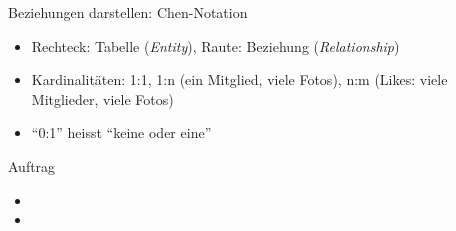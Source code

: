 \begin{frame}{Beziehungen darstellen: }{Chen-Notation}
  \begin{center}
  \end{center}
  \begin{itemize}
    \item Rechteck: Tabelle (\textit{Entity}), Raute: Beziehung (\textit{Relationship})
    \item Kardinalitäten: 1:1, 1:n (ein Mitglied, viele Fotos), n:m (Likes: viele Mitglieder, viele Fotos)
    \item \enquote{0:1} heisst \enquote{keine oder eine}
  \end{itemize}
\end{frame}

\begin{frame}{Auftrag}{}
  \begin{itemize}
    \item {}
    \item {}
  \end{itemize}
\end{frame}

